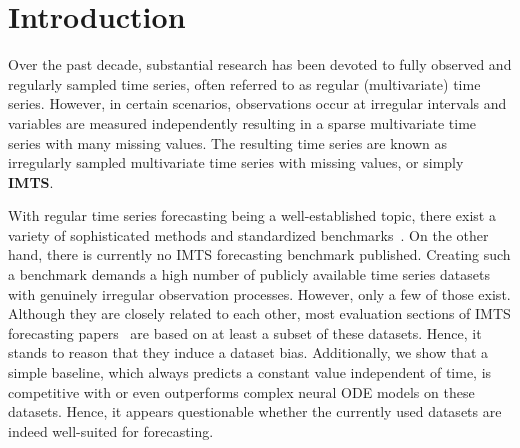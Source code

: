 \section{Introduction}\label{sec:intro}
Over the past decade, substantial research has been devoted to fully observed
and regularly sampled time series, often referred to as regular (multivariate)
time series.
However, in certain scenarios, observations occur at irregular intervals
and variables are measured independently resulting in a sparse multivariate time series
with many missing values.
The resulting time series are known as irregularly sampled multivariate time series with missing values, or simply \textbf{IMTS}.

With regular time series forecasting being a well-established
topic, there exist a variety of sophisticated methods and standardized
benchmarks~\citep{Godahewa2021.Monasha, Gilpin2021.Chaosa,Bauer2021.Libra}.
On the other hand, there is currently no IMTS forecasting benchmark published.
Creating such a benchmark demands a high number of publicly available
time series datasets with genuinely irregular observation processes.
However, only a few of those exist. Although they are closely related
to each other, most evaluation sections of IMTS forecasting papers~\citep{Bilos2021.Neurald, Schirmer2022.Modelingb, Yalavarthi2024.GraFITi, Zhang2024.Irregular}
are based on at least a subset of these datasets.
Hence, it stands to reason that they induce a dataset bias.
Additionally, we show that a simple baseline, which always predicts a constant value independent of time, is competitive with or even outperforms complex neural ODE models on these datasets.
Hence, it appears questionable whether the currently used datasets are indeed well-suited for forecasting.


